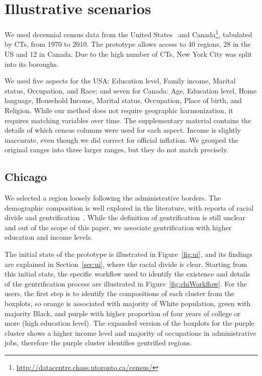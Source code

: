 \section{Illustrative scenarios}
\label{sec:study}

We used decennial census data from the United States~\cite{nhgis} and
Canada\footnote{\url{http://datacentre.chass.utoronto.ca/census/}}, tabulated by
CTs,  from 1970 to 2010. The prototype allows access to 40 regions, 28 in the US
and 12 in Canada. Due to the high number of CTs, New York City was split into
its boroughs. 


We used five aspects for the USA: Education level, Family income, Marital
status, Occupation, and Race; and seven for Canada: Age, Education level, Home
language, Household Income, Marital status, Occupation, Place of birth, and
Religion.  While our method does not require geographic harmonization, it
requires matching variables over time. The supplementary material contains the
details of which census columns were used for each aspect. Income is slightly
inaccurate, even though we did correct for official inflation. We grouped the
original ranges into three larger ranges, but they do not match precisely.

\subsection{Chicago}
We selected a region loosely following the administrative borders. The
demographic composition is well explored in the literature, with reports of
racial divide and gentrification~\cite{Delmelle2016,Delmelle2017,Hwang2014}.
While the definition of gentrification is still unclear and out of the scope of
this paper, we associate gentrification with higher education and income levels.


The initial state of the prototype is illustrated in Figure~\ref{fig:ui}, and
its findings are explained in Section~\ref{sec:ui}, where the racial divide is
clear. Starting from this initial state, the specific workflow used to identify
the existence and details of the gentrification process are illustrated in
Figure~\ref{fig:chiWorkflow}. For the users, the first step is to identify the
compositions of each cluster from the boxplots, so orange is associated with
majority of White population, green with majority Black, and purple with higher
proportion of four years of college or more (high education level). The expanded
version of the boxplots for the purple cluster shows a higher income level and
majority of occupations in administrative jobs, therefore the purple cluster
identifies gentrified regions. 

